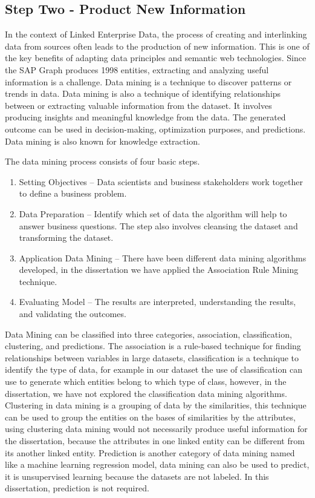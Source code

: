 \documentclass{article}
\begin{document}
\maketitle
\subsection{Step Two - Product New Information}
In the context of Linked Enterprise Data, the process of creating and interlinking data from sources often leads to the production of new information. This is one of the key benefits of adapting data principles and semantic web technologies. Since the SAP Graph produces 1998 entities, extracting and analyzing useful information is a challenge. Data mining is a technique to discover patterns or trends in data. Data mining is also a technique of identifying relationships between or extracting valuable information from the dataset. It involves producing insights and meaningful knowledge from the data. The generated outcome can be used in decision-making, optimization purposes, and predictions. Data mining is also known for knowledge extraction. \parencite{chen1996}

The data mining process consists of four basic steps. 
\begin{enumerate}
    \item Setting Objectives – Data scientists and business stakeholders work together to define a business problem.
    \item Data Preparation – Identify which set of data the algorithm will help to answer business questions. The step also involves cleansing the dataset and transforming the dataset.
    \item Application Data Mining – There have been different data mining algorithms developed, in the dissertation we have applied the Association Rule Mining technique.
    \item Evaluating Model – The results are interpreted, understanding the results, and validating the outcomes.
\end{enumerate}

Data Mining can be classified into three categories, association, classification, clustering, and predictions. The association is a rule-based technique for finding relationships between variables in large datasets, classification is a technique to identify the type of data, for example in our dataset the use of classification can use to generate which entities belong to which type of class, however, in the dissertation, we have not explored the classification data mining algorithms. Clustering in data mining is a grouping of data by the similarities, this technique can be used to group the entities on the bases of similarities by the attributes, using clustering data mining would not necessarily produce useful information for the dissertation, because the attributes in one linked entity can be different from its another linked entity. Prediction is another category of data mining named like a machine learning regression model, data mining can also be used to predict, it is unsupervised learning because the datasets are not labeled. In this dissertation, prediction is not required. \parencite{madni2017}
\end{document}

